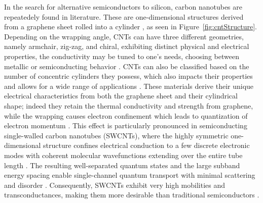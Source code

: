 In the search for alternative semiconductors to silicon, carbon nanotubes are
repeatedely found in literature. These are one-dimensional structures derived
from a graphene sheet rolled into a cylinder \citep{iijimaHelical1991}, as seen
in Figure~\ref{fig:cntStructure}. Depending on the wrapping angle, CNTs can have
three different geometries, namely armchair, zig-zag, and chiral, exhibiting
distinct physical and electrical properties, \eg{} the conductivity may be tuned
to one's needs, choosing between metallic or semiconducting behavior
\citep{dresselhausChapter1996, avourisMolecular2002, popovCarbon2004}. CNTs can
also be classified based on the number of concentric cylinders they possess,
which also impacts their properties and allows for a wide range of applications
\citep{popovCarbon2004}. These materials derive their unique electrical
characteristics from both the graphene sheet and their cylindrical shape; indeed
they retain the thermal conductivity and strength from graphene, while the
wrapping causes electron confinement which leads to quantization of electron
momentum \citep{avourisMolecular2002, mceuenSinglewalled2002}. This effect is
particularly pronounced in semiconducting single-walled carbon nanotubes
(SWCNTs), where the highly symmetric one-dimensional structure confines
electrical conduction to a few discrete electronic modes with coherent molecular
wavefunctions extending over the entire tube length \cite{tansIndividual1997}.
The resulting well-separated quantum states and the large subband energy spacing
enable single-channel quantum transport with minimal scattering and disorder
\cite{huangQuantum2025a}. Consequently, SWCNTs exhibit very high mobilities and
transconductances, making them more desirable than traditional semiconductors
\citep{mceuenElectron2004}.

